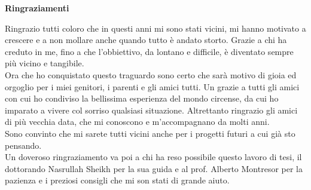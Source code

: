 \thispagestyle{empty}

\begin{center}
  {\bf \Huge Ringraziamenti}
\end{center}

\vspace{2cm}
\noindent Ringrazio tutti coloro che in questi anni mi sono stati vicini, mi hanno motivato a crescere e a non mollare anche quando tutto è andato storto. Grazie a chi ha creduto in me, fino a che l'obbiettivo, da lontano e difficile, è diventato sempre più vicino e tangibile.\\
Ora che ho conquistato questo traguardo sono certo che sarà motivo di gioia ed orgoglio per i miei genitori, i parenti e gli amici tutti. Un grazie a tutti gli amici con cui ho condiviso la bellissima esperienza del mondo circense, da cui ho imparato a vivere col sorriso qualsiasi situazione. Altrettanto ringrazio gli amici di più vecchia data, che mi conoscono e m'accompagnano da molti anni.\\
Sono convinto che mi sarete tutti vicini anche per i progetti futuri a cui già sto pensando.\\
Un doveroso ringraziamento va poi a chi ha reso possibile questo lavoro di tesi, il dottorando Nasrullah Sheikh per la sua guida e al prof. Alberto Montresor per la pazienza e i preziosi consigli che mi son stati di grande aiuto.
